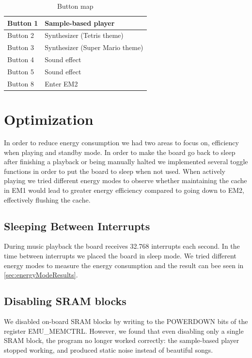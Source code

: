 \begin{table}[H]
	\begin{center}
	\begin{tabular}{ |l|l| }
	  \hline
      Button 1 & Sample-based player \\
	  \hline
      Button 2 & Synthesizer (Tetris theme)  \\
	  \hline
      Button 3 & Synthesizer (Super Mario theme)  \\
	  \hline
      Button 4 & Sound effect \\
	  \hline
      Button 5 & Sound effect \\
	  \hline
      Button 8 & Enter EM2\\
	  \hline
	\end{tabular}
	\caption{Button map}
	\label{tab:button-map}
	\end{center}
\end{table}


\section{Optimization}
In order to reduce energy consumption we had two areas to focus on, efficiency when playing and standby mode. In order to make the board go back to sleep after finishing a playback or being manually halted we implemented several toggle functions in order to put the board to sleep when not used. When actively playing we tried different energy modes to observe whether maintaining the cache in EM1 would lead to greater energy efficiency compared to going down to EM2, effectively flushing the cache.

\subsection{Sleeping Between Interrupts}
During music playback the board receives 32.768 interrupts each second. In the time between interrupts we placed the board in sleep mode. We tried different energy modes to measure the energy consumption and the result can bee seen in \ref{sec:energyModeResults}.

\subsection{Disabling SRAM blocks}
We disabled on-board SRAM blocks by writing to the POWERDOWN bits of the register EMU\_MEMCTRL. However, we found that even disabling only a single SRAM block, the program no longer worked correctly: the sample-based player stopped working, and produced static noise instead of beautiful songs.\label{dedicated-to-peter}

